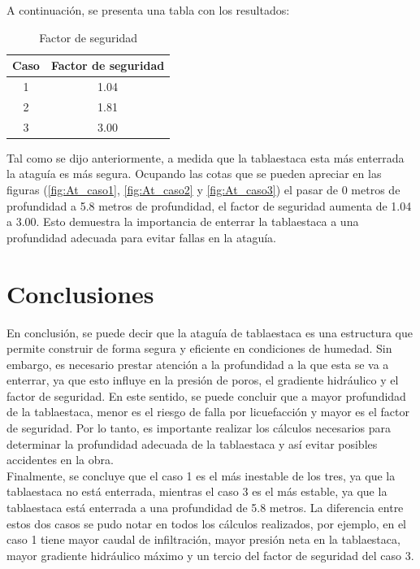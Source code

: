 \documentclass{article}
\begin{document}
A continuación, se presenta una tabla con los resultados:

\begin{table}[h!]
  \centering
  \begin{tabular}{cc}
    \hline
    \textbf{Caso} & \textbf{Factor de seguridad} \\
    \hline
    1 &1.04 \\
    2 &1.81 \\
    3 &3.00 \\
    \hline
  \end{tabular}
  \caption{Factor de seguridad}
  \label{tab:seguridad}
\end{table}

Tal como se dijo anteriormente, a medida que la tablaestaca esta más enterrada la ataguía es más segura. Ocupando las cotas que se pueden apreciar en las figuras (\ref{fig:At_caso1}, \ref{fig:At_caso2} y \ref{fig:At_caso3}) el pasar de 0 metros de profundidad a 5.8 metros de profundidad, el factor de seguridad aumenta de 1.04 a 3.00. Esto demuestra la importancia de enterrar la tablaestaca a una profundidad adecuada para evitar fallas en la ataguía. 

\newpage

\section{Conclusiones}

En conclusión, se puede decir que la ataguía de tablaestaca es una estructura que permite construir de forma segura y eficiente en condiciones de humedad. Sin embargo, es necesario prestar atención a la profundidad a la que esta se va a enterrar, ya que esto influye en la presión de poros, el gradiente hidráulico y el factor de seguridad. En este sentido, se puede concluir que a mayor profundidad de la tablaestaca, menor es el riesgo de falla por licuefacción y mayor es el factor de seguridad. Por lo tanto, es importante realizar los cálculos necesarios para determinar la profundidad adecuada de la tablaestaca y así evitar posibles accidentes en la obra.\\

Finalmente, se concluye que el caso 1 es el más inestable de los tres, ya que la tablaestaca no está enterrada, mientras el caso 3 es el más estable, ya que la tablaestaca está enterrada a una profundidad de 5.8 metros. La diferencia entre estos dos casos se pudo notar en todos los cálculos realizados, por ejemplo, en el caso 1 tiene mayor caudal de infiltración, mayor presión neta en la tablaestaca, mayor gradiente hidráulico máximo y un tercio del factor de seguridad del caso 3.
\end{document}
